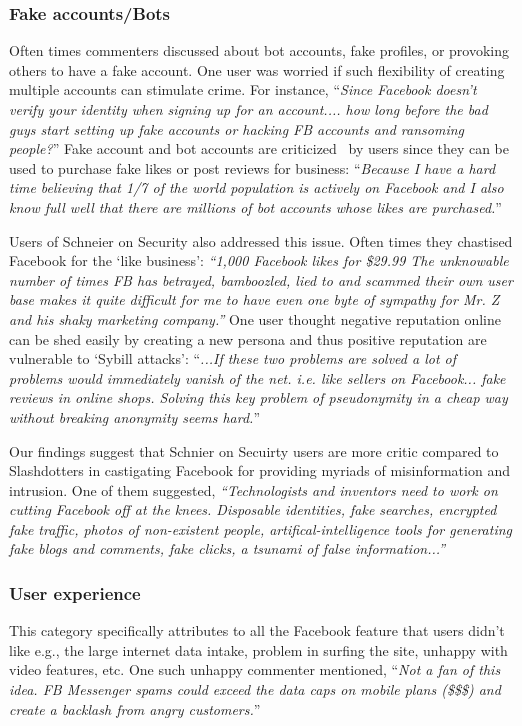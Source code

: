  \subsubsection{Fake accounts/Bots}
 Often times commenters discussed about bot accounts, fake profiles, or provoking others to have a fake account. One user was worried if such flexibility of creating multiple accounts can stimulate crime. For instance, ``\textit{Since Facebook doesn't verify your identity when signing up for an account.... how long before the bad guys start setting up fake accounts or hacking FB accounts and ransoming people?}'' Fake account and bot accounts are criticized~\cite{ferrara2016rise} by users since they can be used to purchase fake likes or post reviews for business:
    ``\textit{Because I have a hard time believing that 1/7 of the world population is actively on Facebook and I also know full well that there are millions of bot accounts whose likes are purchased.}''
    
    Users of Schneier on Security also addressed this issue. Often times they chastised Facebook for the `like business': \textit{``1,000 Facebook likes for \$29.99 The unknowable number of times FB has betrayed, bamboozled, lied to and scammed their own user base makes it quite difficult for me to have even one byte of sympathy for Mr. Z and his shaky marketing company.''} One user thought negative reputation online can be shed easily by creating a new persona and thus positive reputation are vulnerable to `Sybill attacks':
    ``\textit{...If these two problems are solved a lot of problems would immediately vanish of the net. i.e. like sellers on Facebook... fake reviews in online shops. Solving this key problem of pseudonymity in a cheap way without breaking anonymity seems hard.}''
    
    Our findings suggest that Schnier on Secuirty users are more critic compared to Slashdotters in castigating Facebook for providing myriads of misinformation and intrusion. One of them suggested, \textit{``Technologists and inventors need to work on cutting Facebook off at the knees. Disposable identities, fake searches, encrypted fake traffic, photos of non-existent people, artifical-intelligence tools for generating fake blogs and comments, fake clicks, a tsunami of false information...''}
    
 \subsubsection{User experience}
 This category specifically attributes to all the Facebook feature that users didn't like e.g., the large internet data intake, problem in surfing the site, unhappy with video features, etc. One such unhappy commenter mentioned, ``\textit{Not a fan of this idea. FB Messenger spams could exceed the data caps on mobile plans (\$\$\$) and create a backlash from angry customers.}''
    
